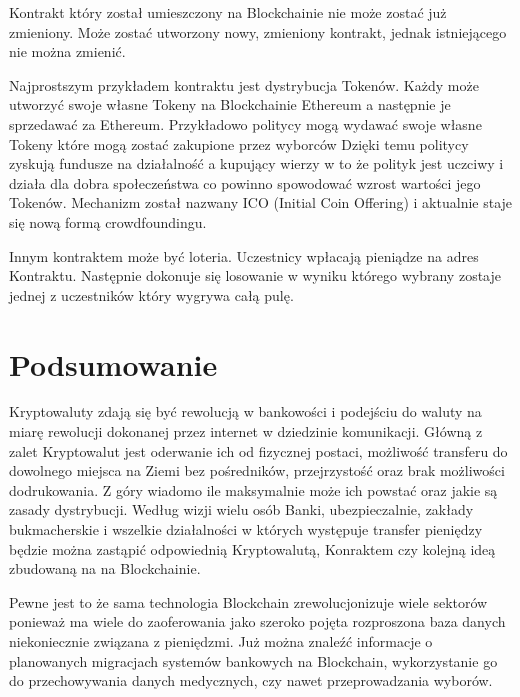 \documentclass[journal,12pt,onecolumn,draftclsnofoot,]{IEEEtran}
\begin{document}
Kontrakt który został umieszczony na Blockchainie nie może zostać już zmieniony. Może zostać utworzony nowy, zmieniony
kontrakt, jednak istniejącego nie można zmienić.

Najprostszym przykładem kontraktu jest dystrybucja Tokenów. Każdy może utworzyć swoje własne Tokeny na Blockchainie
Ethereum a następnie je sprzedawać za Ethereum. Przykładowo politycy mogą wydawać swoje własne Tokeny które mogą zostać
zakupione przez wyborców Dzięki temu politycy zyskują fundusze na działalność a kupujący wierzy w to że polityk jest
uczciwy i działa dla dobra społeczeństwa co powinno spowodować wzrost wartości jego Tokenów. Mechanizm został nazwany
ICO (Initial Coin Offering) i aktualnie staje się nową formą crowdfoundingu.

Innym kontraktem może być loteria. Uczestnicy wpłacają pieniądze na adres Kontraktu. Następnie dokonuje się losowanie w
wyniku którego wybrany zostaje jednej z uczestników który wygrywa całą pulę.

\section*{Podsumowanie}

Kryptowaluty zdają się być rewolucją w bankowości i podejściu do waluty na miarę rewolucji dokonanej przez internet w
dziedzinie komunikacji. Główną z zalet Kryptowalut jest oderwanie ich od fizycznej postaci, możliwość transferu do
dowolnego miejsca na Ziemi bez pośredników, przejrzystość oraz brak możliwości dodrukowania. Z góry wiadomo ile
maksymalnie może ich powstać oraz jakie są zasady dystrybucji. Według wizji wielu osób Banki, ubezpieczalnie, zakłady
bukmacherskie i wszelkie działalności w których występuje transfer pieniędzy będzie można zastąpić odpowiednią
Kryptowalutą, Konraktem czy kolejną ideą zbudowaną na na Blockchainie.

Pewne jest to że sama technologia Blockchain zrewolucjonizuje wiele sektorów ponieważ ma wiele do zaoferowania jako
szeroko pojęta rozproszona baza danych niekoniecznie związana z pieniędzmi. Już można znaleźć informacje o planowanych
migracjach systemów bankowych na Blockchain, wykorzystanie go do przechowywania danych medycznych, czy nawet
przeprowadzania wyborów.
\end{document}
